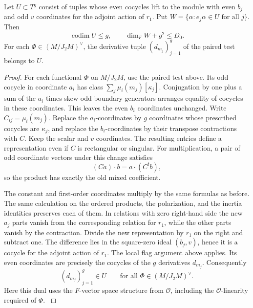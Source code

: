 \begin{proposition}\label{prop:marked-independent-lift-directions}
Let \(U\subset T^g\) consist of tuples whose even cocycles
lift to the module with even \(b_j\) and odd \(v\) coordinates
for the adjoint action of \(r_1\). Put
\(W=\{\alpha:e_j\alpha\in U\text{ for all }j\}\). Then
\[
 \operatorname{codim}U\le g,\qquad \dim_F W+g^2\le D_0 .
\]
For each \(\Phi\in(M/J_2M)^\vee\), the derivative tuple
\((d_{m_j})_{j=1}^g\) of the paired test belongs to \(U\).
\end{proposition}

\begin{proof}
For each functional \(\Phi\) on \(M/J_2M\), use
the paired test above. Its odd cocycle in coordinate
\(a_i\) has class
\(\sum_j\mu_i(m_j)[\kappa_j]\). Conjugation by one plus
a sum of the \(a_i\) times skew odd boundary generators
arranges equality of cocycles in these coordinates.
This leaves the even \(b_i\) coordinates unchanged.
Write \(C_{ij}=\mu_i(m_j)\).
Replace the \(a_i\)-coordinates by \(g\) coordinates
whose prescribed cocycles are \(\kappa_j\), and
replace the \(b_i\)-coordinates by their transpose
contractions with \(C\). Keep the scalar and \(v\)
coordinates. The resulting entries define a
representation even if \(C\) is rectangular or singular.
For multiplication, a pair of odd coordinate vectors
under this change satisfies
\[
           (C a)\cdot b=a\cdot(C^t b),
\]
so the product has exactly the old mixed coefficient.

The constant and first-order coordinates multiply by
the same formulas as before. The same calculation on
the ordered products, the polarization, and the inertia
identities preserves each of them. In relations with
zero right-hand side the new \(a_j\) parts vanish from
the corresponding relation for \(r_1\), while the other
parts vanish by the contraction.  Divide the new
representation by \(r_1\) on the right and subtract
one. The difference lies in the square-zero ideal
\((b_j,v)\), hence it is a cocycle for the adjoint action
of \(r_1\). The local flag argument above applies.
Its even coordinates are precisely the cocycles
of the \(g\) derivatives \(d_{m_j}\).
Consequently
\[
                  (d_{m_j})_{j=1}^g\in U
                    \qquad\text{for all }\Phi\in(M/J_2M)^\vee .
\]
Here this dual uses the \(F\)-vector space structure
from \(\mathcal O\), including the \(\mathcal O\)-linearity
required of \(\Phi\).  \label{cor:ordinary-patching-cotangent-10}


\end{proof}
